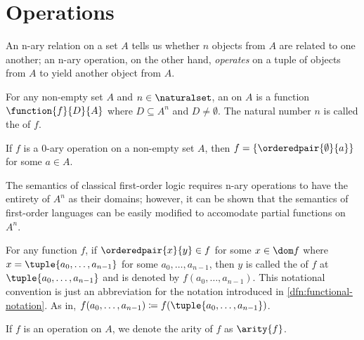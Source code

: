\newpage
\section{Operations}
An n-ary relation on a set \( A \) tells us whether \( n \) objects from \( A \) are related to one another; an n-ary operation, on the other hand, \emph{operates}
on a tuple of objects from \( A \) to yield another object from \( A \).

\begin{dfn}
    \label{dfn:n-ary-operation}
    For any non-empty set \( A \) and \( n \in \naturalset \), an  on \( A \) is a function
    \( \function{f}{D}{A} \) where \( D \subseteq A^{n} \) and \( D \neq \emptyset \).
    The natural number \( n \) is called the  of \( f \).
\end{dfn}

\begin{cor}
     \label{cor:0-ary-operations}
    If \( f \) is a \( 0 \)-ary operation on a non-empty set \( A \), then \( f = \mleft\{ \orderedpair{\emptyset}{a} \mright\} \)
    for some \( a \in A \).
\end{cor}

\begin{rem}
    The semantics of classical first-order logic requires n-ary operations to have the entirety of \( A^{n} \) as their domains; however, it can be shown
    that the semantics of first-order languages can be easily modified to accomodate partial functions on \( A^{n} \).
\end{rem}

\begin{notation}
     \label{notation:functional-notation-tuple-version}
    For any function \( f \), if \( \orderedpair{x}{y} \in f \) for some \( x \in \dom f \) where \( x = \tuple{a_{0}, \dots, a_{n-1}} \) for some
    \( a_{0},\dots,a_{n-1} \), then \( y \) is called the  of \( f \) at \( \tuple{a_{0}, \dots, a_{n-1}} \) and is denoted by \( f(a_{0},\dots,a_{n-1}) \).
    This notational convention is just an abbreviation for the notation introduced in \cref{dfn:functional-notation}. As in,
    \( f(a_{0},\dots, a_{n-1}) \coloneq  f(\tuple{a_{0}, \dots, a_{n-1}}) \).
\end{notation}

\begin{notation}[Arity]
     \label{notation:arity-of-n-ary-operations}
    If \( f \) is an operation on \( A \), we denote the arity of \( f \) as \( \arity{f} \).
\end{notation}

